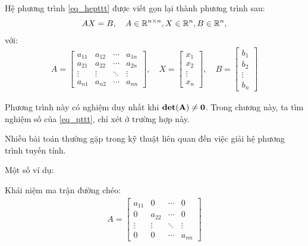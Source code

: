 \documentclass[12pt]{article}
\begin{document}
Hệ phương trình \eqref{eq_hepttt} được viết gọn lại thành phương trình sau:
\begin{align}\label{eq_pttt}
 AX = B, \quad A \in {\mathbb{R}}^{n \times n}, X \in {\mathbb{R}}^{n}, B \in {\mathbb{R}}^{n}, 
\end{align}
với:
\begin{align*}
 A = \left[\begin{array}{cccc}
            a_{11} & a_{12} & \cdots & a_{1n}\\
            a_{21} & a_{22} & \cdots & a_{2n}\\
            \vdots & \vdots & \ddots & \vdots\\
            a_{n1} & a_{n2} & \cdots & a_{nn}
           \end{array}\right], \quad
 X = \left[\begin{array}{c}
            x_1\\
            x_2\\
            \vdots\\
            x_n
           \end{array}\right], \quad
 B = \left[\begin{array}{c}
            b_1\\
            b_2\\
            \vdots\\
            b_n
           \end{array}\right]
\end{align*}

Phương trình này có nghiệm duy nhất khi $\bf{det(A) \neq 0}$. Trong chương này, ta tìm nghiệm số của \eqref{eq_pttt}, chỉ xét ở trường hợp này.

\newpage{}

Nhiều bài toán thường gặp trong kỹ thuật liên quan đến việc giải hệ phương trình tuyến tính.

Một số ví dụ:

\newpage{}

Khái niệm ma trận đường chéo:
\begin{align*}
A = \left[\begin{array}{cccc}
            a_{11} & 0 & \cdots & 0\\
            0 & a_{22} & \cdots & 0\\
            \vdots & \vdots & \ddots & \vdots\\
            0 & 0 & \cdots & a_{nn}
           \end{array}\right]
\end{align*} 
\end{document}
